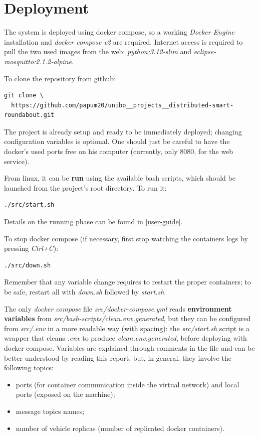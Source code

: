 \section{Deployment}\label{deployment}

The system is deployed using docker compose, so a working \textit{Docker Engine}
installation and \textit{docker compose v2} are required. Internet access is
required to pull the two used images from the web: \textit{python:3.12-slim} and
\textit{eclipse-mosquitto:2.1.2-alpine}.

To clone the repository from github:
\begin{verbatim}
git clone \
  https://github.com/papum20/unibo__projects__distributed-smart-roundabout.git
\end{verbatim}

The project is already setup and ready to be immediately deployed; changing
configuration variables is optional. One should just be careful to have the
docker's used ports free on his computer (currently, only 8080, for the web
service).

From linux, it can be \textbf{run} using the available bash scripts, which
should be launched from the project's root directory. To run it:
\begin{verbatim}
./src/start.sh
\end{verbatim}

Details on the running phase can be found in \ref{user-guide}.

To stop docker compose (if necessary, first stop watching the containers logs
by pressing \textit{Ctrl+C}):
\begin{verbatim}
./src/down.sh
\end{verbatim}

Remember that any variable change requires to restart the proper containers; to
be safe, restart all with \textit{down.sh} followed by \textit{start.sh}.

The only \textit{docker compose} file \textit{src/docker-compose.yml} reads
\textbf{environment variables} from
\textit{src/bash-scripts/clean.env.generated}, but they can be configured from
\textit{src/.env} in a more readable way (with spacing): the
\textit{src/start.sh} script is a wrapper that cleans \textit{.env} to produce
\textit{clean.env.generated}, before deploying with docker compose. Variables
are explained through comments in the file and can be better understood by
reading this report, but, in general, they involve the following topics:
\begin{itemize}
  \item ports (for container communication inside the virtual network) and local
  ports (exposed on the machine);
  \item message topics names;
  \item number of vehicle replicas (number of replicated docker containers).
\end{itemize}

